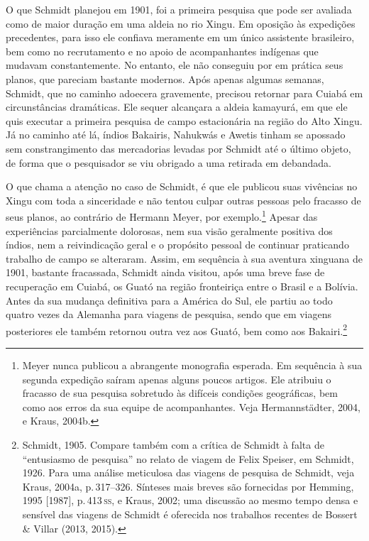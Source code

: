 O que Schmidt planejou em 1901, foi a primeira pesquisa que pode ser
avaliada como de maior duração em uma aldeia no rio Xingu. Em oposição
às expedições precedentes, para isso ele confiava meramente em um único
assistente brasileiro, bem como no recrutamento e no apoio de
acompanhantes indígenas que mudavam constantemente. No entanto, ele não
conseguiu por em prática seus planos, que pareciam bastante modernos.
Após apenas algumas semanas, Schmidt, que no caminho adoecera
gravemente, precisou retornar para Cuiabá em circunstâncias dramáticas.
Ele sequer alcançara a aldeia kamayurá, em que ele quis executar a
primeira pesquisa de campo estacionária na região do Alto Xingu. Já no
caminho até lá, índios Bakairis, Nahukwás e Awetis tinham se apossado sem
constrangimento das mercadorias levadas por Schmidt até o último objeto,
de forma que o pesquisador se viu obrigado a uma retirada em debandada.

O que chama a atenção no caso de Schmidt, é que ele publicou suas
vivências no Xingu com toda a sinceridade e não tentou culpar outras
pessoas pelo fracasso de seus planos, ao contrário de Hermann Meyer, por
exemplo.\footnote{Meyer nunca publicou a abrangente monografia esperada.
  Em sequência à sua segunda expedição saíram apenas alguns poucos
  artigos. Ele atribuiu o fracasso de sua pesquisa sobretudo às
  difíceis condições geográficas, bem como aos erros da sua equipe de
  acompanhantes. Veja Hermannstädter, 2004, e Kraus, 2004b.} Apesar das
experiências parcialmente dolorosas, nem sua visão geralmente positiva
dos índios, nem a reivindicação geral e o propósito pessoal de
continuar praticando trabalho de campo se alteraram. Assim, em
sequência à sua aventura xinguana de 1901, bastante fracassada, Schmidt
ainda visitou, após uma breve fase de recuperação em Cuiabá, os Guató na
região fronteiriça entre o Brasil e a Bolívia. Antes da sua mudança
definitiva para a América do Sul, ele partiu ao todo quatro vezes da
Alemanha para viagens de pesquisa, sendo que em viagens posteriores ele
também retornou outra vez aos Guató, bem como aos Bakairi.\footnote{Schmidt,
  1905. Compare também com a crítica de Schmidt à falta de
  ``entusiasmo de pesquisa'' no relato de viagem de Felix Speiser, em
  Schmidt, 1926. Para uma análise meticulosa das viagens de pesquisa
  de Schmidt, veja Kraus, 2004a, p.\,317--326. Sínteses mais breves são
  fornecidas por Hemming, 1995 {[}1987{]}, p.\,413\,\textsc{ss}, e Kraus, 2002; uma
  discussão ao mesmo tempo densa e sensível das viagens de Schmidt é
  oferecida nos trabalhos recentes de Bossert \& Villar (2013, 2015).}

